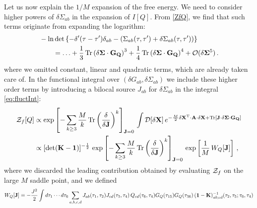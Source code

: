 \documentclass[aps,prx,preprint,onecolumn,citeautoscript,superscriptaddress,nofootinbib,
eqsecnum]{revtex4}
\begin{document}
{Let us now explain the $1/M$ expansion of the free energy. We need to consider higher powers of $\delta \Sigma_{ab}$ in the expansion of $I[Q]$. From \eqref{ZfQ}, we find that such terms originate from expanding the logarithm: 
\begin{equation}
\begin{split}
& - \ln \det \left\{- \delta'(\tau-\tau')  \delta_{ab} - (\Sigma_{ab}(\tau,\tau')+\delta\Sigma_{ab}(\tau,\tau')) \right\}  \\
&\qquad = \ldots + \frac{1}{3} \, \text{Tr} \left( \delta {\bf \Sigma}\cdot{\bf G_Q}  \right)^3 + \frac{1}{4} \, \text{Tr} \left(   \delta {\bf \Sigma}\cdot {\bf G_Q}\right)^4 + {\cal O}(\delta {\bf\Sigma}^5) \,.
\end{split}
\end{equation}
where we omitted constant, linear and quadratic terms, which are already taken care of.
In the functional integral over $(\delta G_{ab}, \delta\Sigma_{ab})$ we include these higher order terms by introducing a bilocal source $J_{ab}$ for $\delta \Sigma_{ab}$ in the integral \eqref{eq:fluctInt}:
\begin{equation}
\label{eq:fluctIntPert}
\begin{split}
{\cal Z}_f[Q] &\propto \exp \left[- \sum_{k\geq 3} \frac{M}{k}  \, \text{Tr} \left(\frac{\delta}{\delta {\bf J}} \right)^k  \right]_{{\bf J}=0}\, \int {\cal D}[\delta {\bf X}] \, e^{ -\frac{M}{2} \delta {\bf X}^\text{T} \cdot {\bf A} \cdot \delta {\bf X} + \text{Tr}[ {\bf J}\cdot \delta {\bf \Sigma} \cdot {\bf G_Q} ]} \\
%
&\propto [\det ({\bf K}-{\bf 1})]^{-\frac{1}{2}}\,  \exp \left[- \sum_{k\geq 3} \frac{M}{k} \, \text{Tr} \left(  \frac{\delta}{\delta {\bf J}} \right)^{k}  \right]_{{\bf J}=0} \,
\exp \left[ \frac{1}{M} \, W_Q[{\bf J}] \right] \,,
\end{split}
 \end{equation}
where we discarded the leading contribution obtained by evaluating ${\cal Z}_f$ on the large $M$ saddle point, and we defined
\begin{equation}
     W_Q[{\bf J}] \equiv -\frac{J^2}{2} \int  d\tau_1 \cdots d\tau_6 \sum_{a,b,c,d} J_{ab}(\tau_1,\tau_2) J_{cd}(\tau_3,\tau_4) \, Q_{cd}(\tau_6,\tau_4) G_Q(\tau_{15}) G_Q(\tau_{36}) \,({\bf 1}- {\bf K})^{-1}_{ab;cd}(\tau_2,\tau_5;\tau_6,\tau_4)
\end{equation}


}
\end{document}
